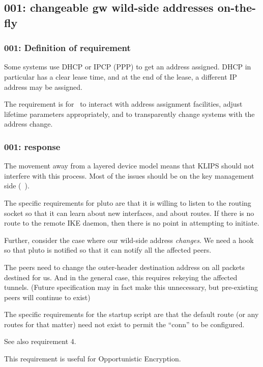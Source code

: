 \subsection{001: changeable gw wild-side addresses on-the-fly}

\subsubsection{001: Definition of requirement}

Some systems use DHCP or IPCP (PPP) to get an address assigned. DHCP in
particular has a clear lease time, and at the end of the lease, a different
IP address may be assigned. 

The requirement is for \freeswan\ to interact with address assignment
facilities, adjust lifetime parameters appropriately, and to transparently 
change systems with the address change.

\subsubsection{001: response}

The movement away from a layered device model means that KLIPS should not
interfere with this process. Most of the issues should be on the key
management side (\pluto\ ).

The specific requirements for pluto are that it is willing to listen to
the routing socket so that it can learn about new interfaces, and about
routes. If there is no route to the remote IKE daemon, then there is no point 
in attempting to initiate.

Further, consider the case where our wild-side address {\em changes}.  
We need a hook so that pluto is notified so that it can notify all the
affected peers. 

The peers need to change the outer-header destination address on all packets
destined for us.  And in the general case, this requires rekeying the affected tunnels.  
(Future specification may in fact make this unnecessary, but pre-existing
peers will continue to exist)

The specific requirements for the startup script are that the default
route (or any routes for that matter) need not exist to permit the ``conn'' to
be configured.

See also requirement 4.

This requirement is useful for Opportunistic Encryption.



